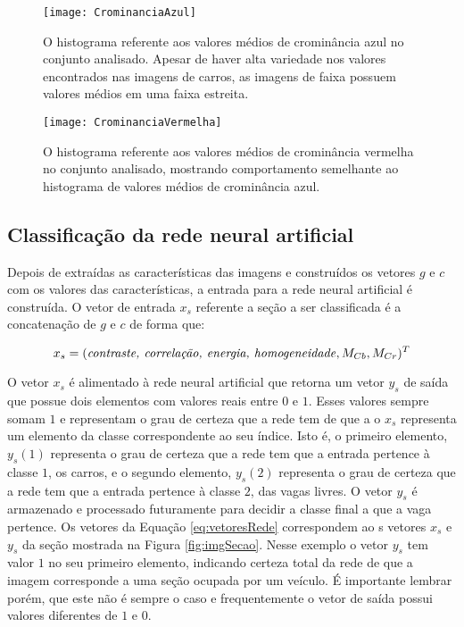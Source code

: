 \begin{figure}
	\centering
	\texttt{[image: CrominanciaAzul]}
	\caption{O histograma referente aos valores médios de crominância azul no conjunto analisado. Apesar de haver alta variedade nos valores encontrados nas imagens de carros, as imagens de faixa possuem valores médios em uma faixa estreita. }
		\label{fig:histCb}
	\centering
\end{figure}

\begin{figure}
	\centering
	\texttt{[image: CrominanciaVermelha]}
	\caption{O histograma referente aos valores médios de crominância vermelha no conjunto analisado, mostrando comportamento semelhante ao histograma de valores médios de crominância azul. }
		\label{fig:histCr}
	\centering
\end{figure}


\subsection{Classificação da rede neural artificial}

Depois de extraídas as características das imagens e construídos os vetores $g$ e $c$ com os valores das características, a entrada para a rede neural artificial é construída. O vetor de entrada $x_s$ referente a seção a ser classificada é a concatenação de $g$ e $c$ de forma que:

\begin{equation}
	x_s = (\text{\textit{contraste, correlação, energia, homogeneidade}}, M_{Cb}, M_{Cr})^T
\end{equation}

O vetor $x_s$ é alimentado à rede neural artificial que retorna um vetor $y_s$ de saída que possue dois elementos com valores reais entre $0$ e $1$. Esses valores sempre somam $1$ e representam o grau de certeza que a rede tem de que a o $x_s$ representa um elemento da classe correspondente ao seu índice. Isto é, o primeiro elemento, $y_s(1)$ representa o grau de certeza que a rede tem que a entrada pertence à classe $1$, os carros, e o segundo elemento, $y_s(2)$ representa o grau de certeza que a rede tem que a entrada pertence à classe $2$, das vagas livres. O vetor $y_s$ é armazenado e processado futuramente para decidir a classe final a que a vaga pertence. Os vetores da Equação \ref{eq:vetoresRede} correspondem ao s vetores $x_s$ e $y_s$ da seção mostrada na Figura \ref{fig:imgSecao}. Nesse exemplo o vetor $y_s$ tem valor $1$ no seu primeiro elemento, indicando certeza total da rede de que a imagem corresponde a uma seção ocupada por um veículo. É importante lembrar porém, que este não é sempre o caso e frequentemente o vetor de saída possui valores diferentes de $1$ e $0$.


